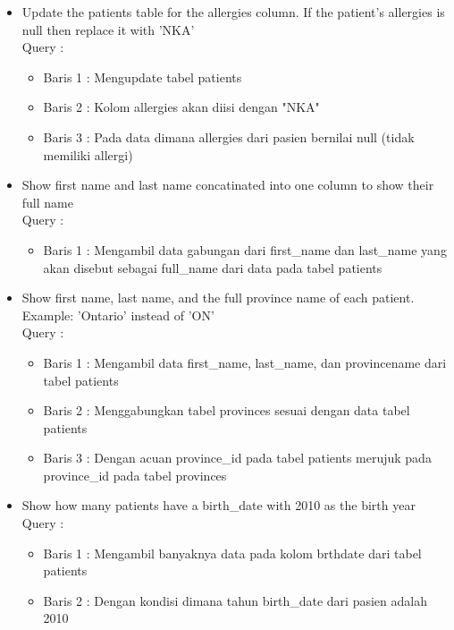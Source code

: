 \documentclass[]{article}
\begin{document}
\begin{itemize}
        \item Update the patients table for the allergies column. If the patient's allergies is null then replace it with 'NKA'
        \\Query :
        
        \begin{itemize}
            \item Baris 1 : Mengupdate tabel patients
            \item Baris 2 : Kolom allergies akan diisi dengan "NKA"
            \item Baris 3 : Pada data dimana allergies dari pasien bernilai null (tidak memiliki allergi)
        \end{itemize}

        \item Show first name and last name concatinated into one column to show their full name
        \\Query :
        
        \begin{itemize}
            \item Baris 1 : Mengambil data gabungan dari first\_name dan last\_name yang akan disebut sebagai full\_name dari data pada tabel patients
        \end{itemize}

        \item Show first name, last name, and the full province name of each patient. Example: 'Ontario' instead of 'ON'
        \\Query :
        
        \begin{itemize}
            \item Baris 1 : Mengambil data first\_name, last\_name, dan provincename dari tabel patients
            \item Baris 2 : Menggabungkan tabel provinces sesuai dengan data tabel patients
            \item Baris 3 : Dengan acuan province\_id pada tabel patients merujuk pada province\_id pada tabel provinces
        \end{itemize}

        \item Show how many patients have a birth\_date with 2010 as the birth year
        \\Query :
        
        \begin{itemize}
            \item Baris 1 : Mengambil banyaknya data pada kolom brthdate dari tabel patients
            \item Baris 2 : Dengan kondisi dimana tahun birth\_date dari pasien adalah 2010
        \end{itemize}

    \end{itemize}
\end{document}
